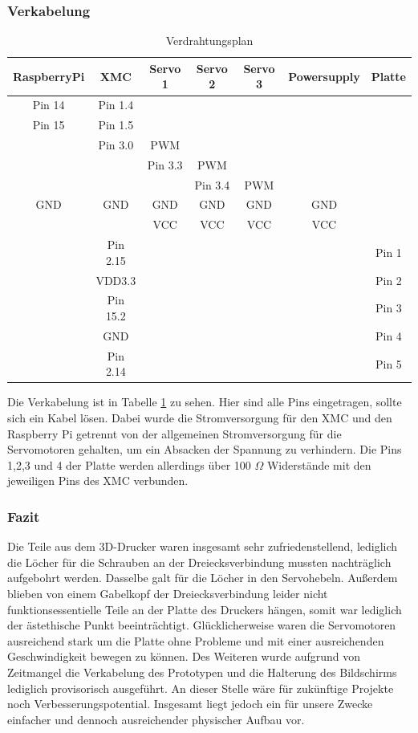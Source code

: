 \documentclass[12pt,a4paper,bibliography=totoc,listof=totoc]{scrartcl}
\begin{document}
\subsubsection{Verkabelung}

\begin{table}[htb]
\centering
\begin{tabular}{|c|c|c|c|c|c|c|}
\hline
 RaspberryPi	& XMC & Servo 1 & Servo 2	& Servo 3 & Powersupply & Platte\\
 \hline
 Pin 14 &Pin 1.4 & & & & &\\
 \hline
 Pin 15 &Pin 1.5 & & & & &\\
 \hline
  & Pin 3.0 & PWM & & & &\\
   \hline
  & & Pin 3.3 & PWM & & &\\
   \hline
  & & & Pin 3.4 & PWM & &\\
   \hline
 GND & GND & GND & GND & GND & GND &\\
   \hline
  &  & VCC & VCC & VCC & VCC &\\
 \hline
  & Pin 2.15 & & & & & Pin 1\\
  \hline
  & VDD3.3 & & & & & Pin 2 \\
  \hline
  & Pin 15.2 & & & & & Pin 3\\
  \hline
  & GND & & & & & Pin 4\\
  \hline
  & Pin 2.14 & & & & & Pin 5 \\
  \hline
\end{tabular}
\caption{Verdrahtungsplan}
\label{tab:verkabelung}
\end{table}
Die Verkabelung ist in Tabelle \ref{tab:verkabelung} zu sehen. Hier sind alle Pins eingetragen, 
sollte sich ein Kabel lösen. Dabei wurde die Stromversorgung für den XMC und den Raspberry Pi getrennt 
von der allgemeinen Stromversorgung für die Servomotoren gehalten, um ein Absacken der Spannung zu verhindern. Die Pins 1,2,3 und 4 der Platte werden allerdings über 100 \(\Omega\) Widerstände mit den jeweiligen Pins des XMC verbunden.

\subsubsection{Fazit}
Die Teile aus dem 3D-Drucker waren insgesamt sehr zufriedenstellend, lediglich die Löcher für die Schrauben 
an der Dreiecksverbindung mussten nachträglich aufgebohrt werden. Dasselbe galt für die Löcher in den Servohebeln. 
Außerdem blieben von einem Gabelkopf der Dreiecksverbindung leider nicht funktionsessentielle Teile an der Platte 
des Druckers hängen, somit war lediglich der ästethische Punkt beeinträchtigt. Glücklicherweise waren die 
Servomotoren ausreichend stark um die Platte ohne Probleme und mit einer ausreichenden Geschwindigkeit bewegen zu 
können. Des Weiteren wurde aufgrund von Zeitmangel die Verkabelung des Prototypen und die Halterung des Bildschirms 
lediglich provisorisch ausgeführt. An dieser Stelle wäre für zukünftige Projekte noch Verbesserungspotential. 
Insgesamt liegt jedoch ein für unsere Zwecke einfacher und dennoch ausreichender physischer Aufbau vor.
\end{document}
